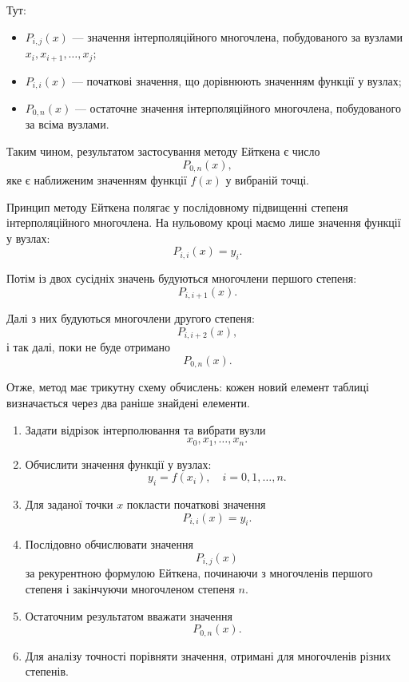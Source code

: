 \documentclass[12pt,a4paper]{article}
\begin{document}
    Тут:
    \begin{itemize}
        \item $P_{i,j}(x)$ --- значення інтерполяційного многочлена, побудованого за вузлами $x_i, x_{i+1}, \dots, x_j$;
        \item $P_{i,i}(x)$ --- початкові значення, що дорівнюють значенням функції у вузлах;
        \item $P_{0,n}(x)$ --- остаточне значення інтерполяційного многочлена, побудованого за всіма вузлами.
    \end{itemize}

    Таким чином, результатом застосування методу Ейткена є число
    $$
    P_{0,n}(x),
    $$
    яке є наближеним значенням функції $f(x)$ у вибраній точці.

    Принцип методу Ейткена полягає у послідовному підвищенні степеня інтерполяційного многочлена. На нульовому кроці маємо лише значення функції у вузлах:
    $$
    P_{i,i}(x)=y_i.
    $$

    Потім із двох сусідніх значень будуються многочлени першого степеня:
    $$
    P_{i,i+1}(x).
    $$

    Далі з них будуються многочлени другого степеня:
    $$
    P_{i,i+2}(x),
    $$
    і так далі, поки не буде отримано
    $$
    P_{0,n}(x).
    $$

    Отже, метод має трикутну схему обчислень: кожен новий елемент таблиці визначається через два раніше знайдені елементи.

    \begin{enumerate}
        \item Задати відрізок інтерполювання та вибрати вузли
        $$
        x_0, x_1, \dots, x_n.
        $$

        \item Обчислити значення функції у вузлах:
        $$
        y_i = f(x_i), \quad i=0,1,\dots,n.
        $$

        \item Для заданої точки $x$ покласти початкові значення
        $$
        P_{i,i}(x)=y_i.
        $$

        \item Послідовно обчислювати значення
        $$
        P_{i,j}(x)
        $$
        за рекурентною формулою Ейткена, починаючи з многочленів першого степеня і закінчуючи многочленом степеня $n$.

        \item Остаточним результатом вважати значення
        $$
        P_{0,n}(x).
        $$

        \item Для аналізу точності порівняти значення, отримані для многочленів різних степенів.
    \end{enumerate}
\end{document}
